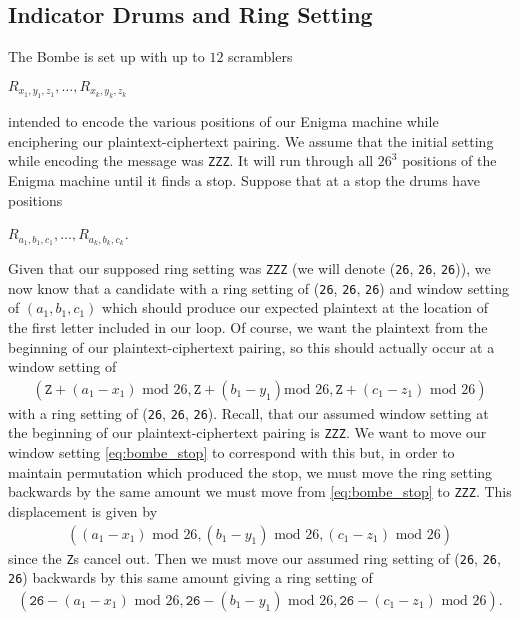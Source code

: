 \subsection{Indicator Drums and Ring Setting}
The Bombe is set up with up to $12$ scramblers
\begin{center}
	$R_{x_1, y_1, z_1},\dots, R_{x_k, y_k, z_k}$
\end{center}
intended to encode the various positions of our Enigma machine while
enciphering our plaintext-ciphertext pairing. We assume that the
initial setting while encoding the message was \texttt{ZZZ}. It will
run through all $26^3$ positions of the Enigma machine until it finds
a stop. Suppose that at a stop the drums have positions
\begin{center}
	$R_{a_1, b_1, c_1},\dots, R_{a_k, b_k, c_k}$.
\end{center}
Given that our supposed ring setting was \texttt{ZZZ} (we will denote
(\texttt{26},
\texttt{26}, \texttt{26})), we now know that a candidate with a ring
setting of (\texttt{26},
\texttt{26}, \texttt{26}) and window setting of $(a_1, b_1, c_1)$
which should produce our expected plaintext at the location of the
first letter included in our loop. Of course, we want the plaintext
from the beginning of our plaintext-ciphertext pairing, so this
should actually occur at a window setting of
\begin{align}
	\label{eq:bombe_stop}
	(\texttt{Z} + (a_1-x_1)\text{ mod }26, \texttt{Z} + (b_1-y_1)\text{
		mod }26, \texttt{Z} + (c_1-z_1)\text{ mod }26)
\end{align}
with a ring setting of (\texttt{26},
\texttt{26}, \texttt{26}). Recall, that our assumed window setting at
the beginning of our plaintext-ciphertext pairing is \texttt{ZZZ}. We
want to move our window setting \ref{eq:bombe_stop} to correspond
with this but, in order to maintain permutation which produced the
stop, we must move the ring setting backwards by the same amount we
must move from \ref{eq:bombe_stop} to \texttt{ZZZ}. This displacement
is given by
\begin{align*}
	((a_1-x_1)\text{ mod }26, (b_1-y_1)\text{ mod }26, (c_1-z_1)\text{ mod }26)
\end{align*}
since the \texttt{Z}s cancel out. Then we must move our assumed ring
setting of (\texttt{26},
\texttt{26}, \texttt{26}) backwards by this same amount giving a ring setting of
\begin{align*}
	(\texttt{26} - (a_1-x_1)\text{ mod }26, \texttt{26} -
	(b_1-y_1)\text{ mod }26, \texttt{26} - (c_1-z_1)\text{ mod }26).
\end{align*}
